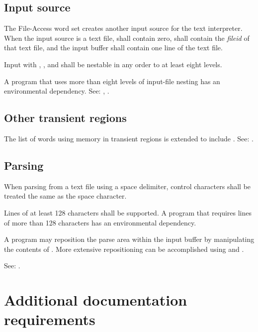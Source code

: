 \subsection{Input source} %
\label{file:source}

The File-Access word set creates another input source for the text
interpreter. When the input source is a text file, 
shall contain zero,  shall contain the \emph{fileid}
of that text file, and the input buffer shall contain one line of
the text file.

Input with , , 
and  shall be nestable in any order to at least
eight levels.

A program that uses more than eight levels of input-file nesting has
an environmental dependency. See:
,
.

\subsection{Other transient regions} %
\label{file:buffers}

The list of words using memory in transient regions is extended to
include . See: .

\subsection{Parsing} %
\label{file:parsing}

When parsing from a text file using a space delimiter, control
characters shall be treated the same as the space character.

Lines of at least 128 characters shall be supported. A program that
requires lines of more than 128 characters has an environmental
dependency.

A program may reposition the parse area within the input buffer by
manipulating the contents of . More extensive
repositioning can be accomplished using  and
.

See: .

\section{Additional documentation requirements} %

